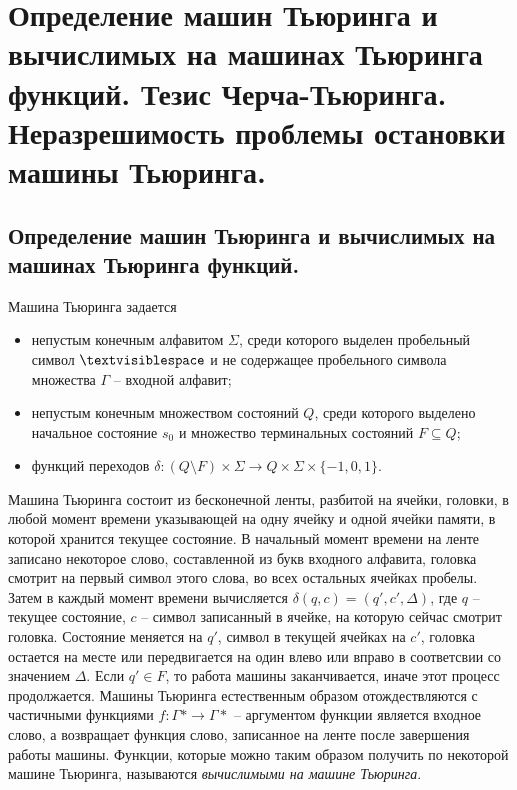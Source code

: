 \section{Определение машин Тьюринга и вычислимых на машинах Тьюринга функций. Тезис Черча-Тьюринга. Неразрешимость проблемы остановки машины Тьюринга.}

\subsection{Определение машин Тьюринга и вычислимых на машинах Тьюринга функций.}

\begin{definition}
  Машина Тьюринга задается
  \begin{itemize}
    \item непустым конечным алфавитом $\Sigma$, среди которого выделен пробельный символ $\textvisiblespace$ и не содержащее пробельного символа множества $\Gamma$ -- входной алфавит;
    \item непустым конечным множеством состояний $Q$, среди которого выделено начальное состояние $s_0$ и множество терминальных состояний $F \subseteq Q$;
    \item функций переходов $\delta : (Q \setminus F) \times \Sigma \to Q \times \Sigma \times \{-1,0,1\}$.
  \end{itemize}
\end{definition}

Машина Тьюринга состоит из бесконечной ленты, разбитой на ячейки, головки, в любой момент времени указывающей на одну ячейку и одной ячейки памяти, в которой хранится текущее состояние. В начальный момент времени на ленте записано некоторое слово, составленной из букв входного алфавита, головка смотрит на первый символ этого слова, во всех остальных ячейках пробелы. Затем в каждый момент времени вычисляется $\delta(q,c) = (q', c', \Delta)$, где $q$ -- текущее состояние, $c$ -- символ записанный в ячейке, на которую сейчас смотрит головка. Состояние меняется на $q'$, символ в текущей ячейках на $c'$, головка остается на месте или передвигается на один влево или вправо в соответсвии со значением $\Delta$. Если $q' \in F$, то работа машины заканчивается, иначе этот процесс продолжается. \newline
Машины Тьюринга естественным образом отождествляются с частичными функциями $f : \Gamma* \to \Gamma*$ -- аргументом функции является входное слово, а возвращает функция слово, записанное на ленте после завершения работы машины. Функции, которые можно таким образом получить по некоторой машине Тьюринга, называются \textit{вычислимыми на машине Тьюринга}.

